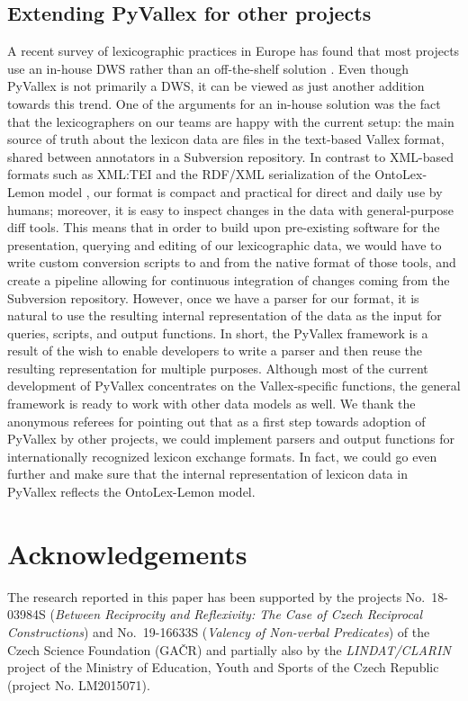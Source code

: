 \documentclass[10pt, a4paper]{article}
\begin{document}
\subsection{Extending PyVallex for other projects}
A recent survey of lexicographic practices in Europe  has found that most projects use an in-house DWS rather than an off-the-shelf solution
\cite{KallasEtAl19lexicographic}.
Even though PyVallex is not primarily a DWS, it can be viewed as just another addition towards this trend.
One of the arguments for an in-house solution was the fact that the lexicographers on our teams are happy with the current setup:
the main source of truth about the lexicon data are files in the text-based Vallex format,
shared between annotators in a Subversion repository.
In contrast to XML-based formats such as XML:TEI \cite{XMLTEI2020}
and the RDF/XML serialization of the OntoLex-Lemon model \cite{BosqueGilGracia19OntoLex},
our format is compact and practical for direct and daily use by humans;
moreover, it is easy to inspect changes in the data with general-purpose diff tools.
This means that in order to build upon pre-existing software for the presentation, querying and editing of our lexicographic data,
we would have to write custom conversion scripts to and from the native format of those tools,
and create a pipeline allowing for continuous integration of changes coming from the Subversion repository.
However, once we have a parser for our format,
it is natural to use the resulting internal representation of the data as the input for queries, scripts, and output functions.
In short, the PyVallex framework is a result of the wish to enable developers to write a parser and then reuse the resulting representation for multiple purposes.
Although most of the current development of PyVallex concentrates on the Vallex-specific functions,
the general framework is ready to work with other data models as well.
We thank the anonymous referees for pointing out that as a first step towards adoption of PyVallex by other projects,
we could implement parsers and output functions for internationally recognized lexicon exchange formats.
In fact, we could go even further and make sure that the internal representation of lexicon data in PyVallex reflects the OntoLex-Lemon model.


\section{Acknowledgements}
The research reported in this paper has been supported by the projects No.\ 18-03984S (\textit{Between Reciprocity and Reflexivity: The Case of Czech Reciprocal Constructions}) and No.\ 19-16633S (\textit{Valency of Non-verbal Predicates}) of the  Czech Science Foundation (GA{\v{C}R}) and partially also by the \textit{LINDAT/CLARIN} project of the Ministry of Education, Youth and Sports of the Czech Republic (project No. LM2015071).
\end{document}
